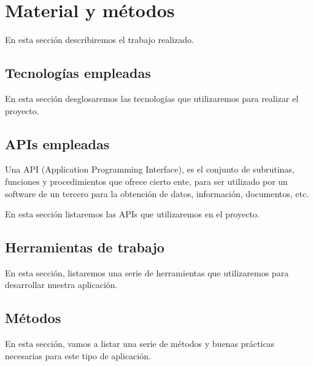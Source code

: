 \chapter{Material y métodos}
\label{material_y_metodos}

En esta sección describiremos el trabajo realizado.


\section{Tecnologías empleadas}
En esta sección desglosaremos las tecnologías que utilizaremos
 para realizar el proyecto.
















\section{APIs empleadas}
Una API (Application Programming Interface), es el conjunto
 de subrutinas, funciones y procedimientos que ofrece cierto ente, 
para ser utilizado por un software de un tercero 
para la obtención de datos, información, documentos, etc.

En esta sección listaremos las APIs que utilizaremos en el proyecto.





\section{Herramientas de trabajo}
En esta sección, listaremos una serie de herramientas que utilizaremos
 para desarrollar nuestra aplicación.

\section{Métodos}
En esta sección, vamos a listar una serie de métodos y buenas prácticas 
necesarias para este tipo de aplicación.
